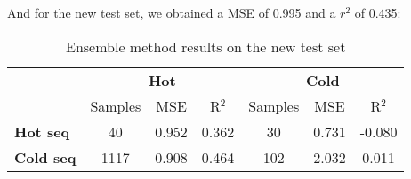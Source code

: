 And for the new test set, we obtained a MSE of 0.995 and a $r^2$ of 0.435:

\begin{table}[ht]
  \centering
  \begin{tabular}{lcccccc}
  \hline
   & \multicolumn{3}{c}{\textbf{Hot}} & \multicolumn{3}{c}{\textbf{Cold}} \\
   & Samples & MSE & R\(^2\) & Samples & MSE & R\(^2\) \\ \hline
  \textbf{Hot seq}  & 40 & 0.952 & 0.362 & 30 & 0.731 & -0.080 \\
  \textbf{Cold seq} & 1117 & 0.908 & 0.464 & 102 & 2.032 & 0.011 \\ \hline
  \end{tabular}
  \caption{Ensemble method results on the new test set}
  \label{tab:summary_performance}
\end{table}

